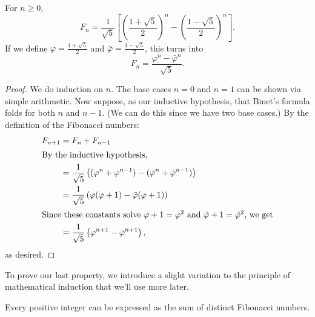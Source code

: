 \documentclass[../m055main.tex]{subfiles}
\begin{document}
\begin{theorem}
    For $n \geq 0$,
    \[ F_n = \frac{1}{\sqrt{5}} \left[ \left( \frac{1 + \sqrt{5}}{2} \right)^{n} - \left( \frac{1 - \sqrt{5}}{2} \right)^{n} \right]. \]
    If we define $\varphi = \frac{1 + \sqrt{5}}{2}$ and $\bar{\varphi} = \frac{1 - \sqrt{5}}{2}$, this turns into
    \[ F_n = \frac{\varphi^{n} - \bar{\varphi}^{n}}{\sqrt{5}}. \]
\end{theorem}

\begin{proof}
    We do induction on $n$.
    The base cases $n=0$ and $n=1$ can be shown via simple arithmetic.
    Now suppose, as our inductive hypothesis, that Binet's formula folds for both $n$ and $n-1$.
    (We can do this since we have two base cases.)
    By the definition of the Fibonacci numbers:
    \begin{align*}
        F_{n+1} &= F_n + F_{n-1} \\
        \intertext{By the inductive hypothesis,}
        &= \frac{1}{\sqrt{5}} \left( (\varphi^{n} + \varphi^{n-1}) - (\bar{\varphi}^{n} + \bar{\varphi}^{n-1}) \right) \\
        &= \frac{1}{\sqrt{5}} \left( \varphi (\varphi + 1) - \bar{\varphi}({\varphi} + 1) \right) \\
        \intertext{Since these constants solve $\varphi + 1 = \varphi^2$ and $\bar{\varphi} + 1 = \bar{\varphi}^2$, we get}
        &= \frac{1}{\sqrt{5}} \left( \varphi^{n+1} - \bar{\varphi}^{n+1} \right),
    \end{align*}
    as desired.
\end{proof}

To prove our last property, we introduce a slight variation to the principle of mathematical induction that we'll use more later.

\begin{theorem}
    Every positive integer can be expressed as the sum of distinct Fibonacci numbers.
\end{theorem}
\end{document}
